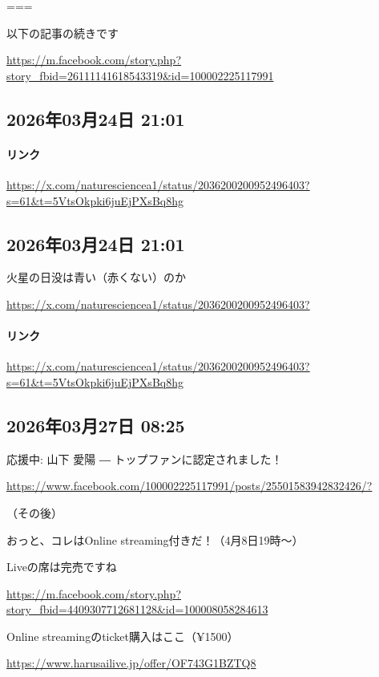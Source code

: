 ===

以下の記事の続きです

\url{https://m.facebook.com/story.php?story_fbid=26111141618543319&id=100002225117991}

\subsection*{2026年03月24日 21:01}

\paragraph{リンク}
\url{https://x.com/naturesciencea1/status/2036200200952496403?s=61&t=5VtsOkpki6juEjPXsBq8hg}

\subsection*{2026年03月24日 21:01}

火星の日没は青い（赤くない）のか

\url{https://x.com/naturesciencea1/status/2036200200952496403?}

\paragraph{リンク}
\url{https://x.com/naturesciencea1/status/2036200200952496403?s=61&t=5VtsOkpki6juEjPXsBq8hg}

\subsection*{2026年03月27日 08:25}

応援中: 山下 愛陽 ― トップファンに認定されました！🎉

\url{https://www.facebook.com/100002225117991/posts/25501583942832426/?}

（その後）

おっと、コレはOnline streaming付きだ！（4月8日19時〜）

Liveの席は完売ですね

\url{https://m.facebook.com/story.php?story_fbid=4409307712681128&id=100008058284613}

Online streamingのticket購入はここ（¥1500）

\url{https://www.harusailive.jp/offer/OF743G1BZTQ8}


